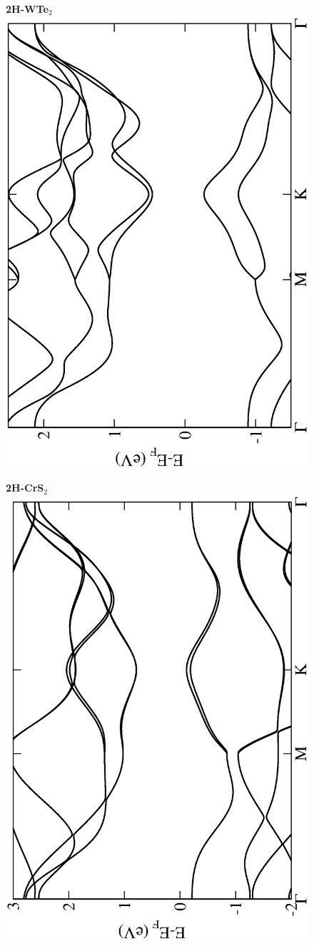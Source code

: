 \begin{figure}[htbp]
\centering
{\bfseries \sffamily 2H-WTe$_{2}$}\\
\includegraphics[width=0.45\linewidth, angle=-90, trim={2.9cm, 0cm, 2cm, 0cm}, clip]{img/SI_figs/BS/2H-WTe2.eps}
\end{figure}

\begin{figure}[htbp]
\centering
{\bfseries \sffamily 2H-CrS$_{2}$}\\
\includegraphics[width=0.45\linewidth, angle=-90, trim={2.9cm, 0cm, 2cm, 0cm}, clip]{img/SI_figs/BS/2H-CrS2.eps}
\end{figure}

